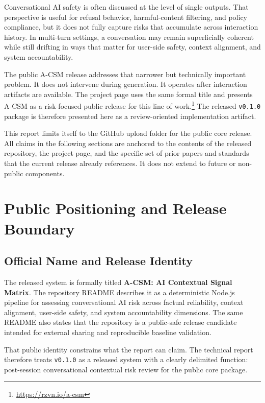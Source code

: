 \documentclass[11pt,a4paper]{article}
\begin{document}
Conversational AI safety is often discussed at the level of single outputs. That perspective is useful for refusal behavior, harmful-content filtering, and policy compliance, but it does not fully capture risks that accumulate across interaction history. In multi-turn settings, a conversation may remain superficially coherent while still drifting in ways that matter for user-side safety, context alignment, and system accountability.

The public A-CSM release addresses that narrower but technically important problem. It does not intervene during generation. It operates after interaction artifacts are available. The project page uses the same formal title and presents A-CSM as a risk-focused public release for this line of work.\footnote{\url{https://rzvn.io/a-csm}} The released \texttt{v0.1.0} package is therefore presented here as a review-oriented implementation artifact.

This report limits itself to the GitHub upload folder for the public core release. All claims in the following sections are anchored to the contents of the released repository, the project page, and the specific set of prior papers and standards that the current release already references. It does not extend to future or non-public components.

\section{Public Positioning and Release Boundary}

\subsection{Official Name and Release Identity}

The released system is formally titled \textbf{A-CSM: AI Contextual Signal Matrix}. The repository README describes it as a deterministic Node.js pipeline for assessing conversational AI risk across factual reliability, context alignment, user-side safety, and system accountability dimensions. The same README also states that the repository is a public-safe release candidate intended for external sharing and reproducible baseline validation.

That public identity constrains what the report can claim. The technical report therefore treats \texttt{v0.1.0} as a released system with a clearly delimited function: post-session conversational contextual risk review for the public core package.
\end{document}
